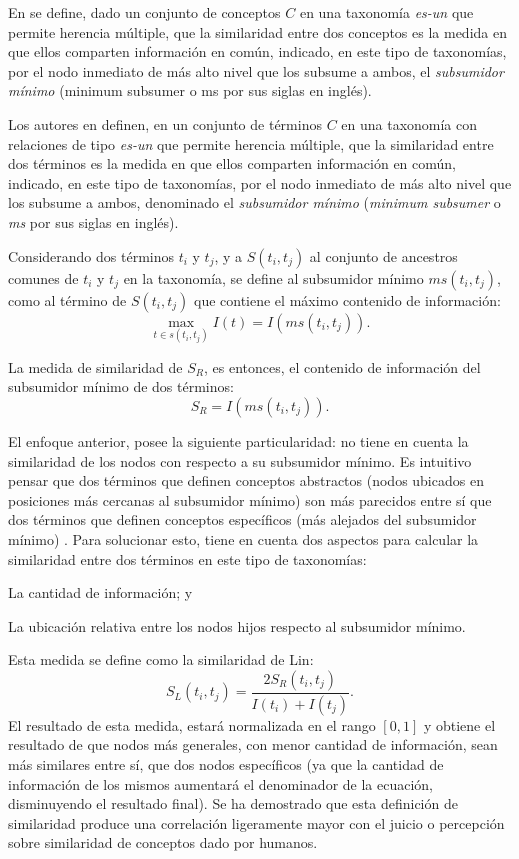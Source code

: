 \bigskip En \citep{resnik1995using} se define, dado un conjunto de conceptos \(C\) en una taxonomía \textit{es-un} que permite herencia múltiple, que la similaridad entre dos conceptos es la medida en que ellos comparten información en común, indicado, en este tipo de taxonomías, por el nodo inmediato de más alto nivel que los subsume a ambos, el \textit{subsumidor mínimo} (minimum subsumer o ms por sus siglas en inglés).

\bigskip Los autores en \citep{resnik1995using} definen, en un conjunto de términos \(C\) en una taxonomía con relaciones de tipo \textit{es-un} que permite herencia múltiple, que la similaridad entre dos términos es la medida en que ellos comparten información en común, indicado, en este tipo de taxonomías, por el nodo inmediato de más alto nivel que los subsume a ambos, denominado el \textit{subsumidor mínimo} (\textit{minimum subsumer} o \textit{ms} por sus siglas en inglés).

\bigskip Considerando dos términos \(t_i\) y \(t_j\), y a \(S(t_i, t_j)\) al conjunto de ancestros comunes de \(t_i\) y \(t_j\) en la taxonomía, se define al subsumidor mínimo \(ms(t_i, t_j)\), como al término de \(S(t_i, t_j)\) que contiene el máximo contenido de información:
\[\max_{t \in s(t_i,t_j)} I(t) = I(ms(t_i,t_j)).\]

La medida de similaridad de \cite{resnik1995using} \(S_R\), es entonces, el contenido de información del subsumidor mínimo de dos términos:
\[S_R = I(ms(t_i,t_j)).\]

\bigskip El enfoque anterior, posee la siguiente particularidad: no tiene en cuenta la similaridad de los nodos con respecto a su subsumidor mínimo. Es intuitivo pensar que dos términos que definen conceptos abstractos (nodos ubicados en posiciones más cercanas al subsumidor mínimo) son más parecidos entre sí que dos términos que definen conceptos específicos (más alejados del subsumidor mínimo) \citep{lin1998information}. Para solucionar esto, \cite{lin1998information} tiene en cuenta dos aspectos para calcular la similaridad entre dos términos en este tipo de taxonomías: \begin{enumerate*} [label=(\roman*)] \item La cantidad de información; y \item La ubicación relativa entre los nodos hijos respecto al subsumidor mínimo.\end{enumerate*} Esta medida se define como  la similaridad de Lin:
\[S_L(t_i, t_j)=\frac{2S_R(t_i,t_j)}{I(t_i)+I(t_j)}.\]
El resultado de esta medida, estará normalizada en el rango \([0, 1]\) y obtiene el resultado de que nodos más generales, con menor cantidad de información, sean más similares entre sí, que dos nodos específicos (ya que la cantidad de información de los mismos aumentará el denominador de la ecuación, disminuyendo el resultado final). Se ha demostrado que esta definición de similaridad produce una correlación ligeramente mayor con el juicio o percepción sobre similaridad de conceptos dado por humanos.


